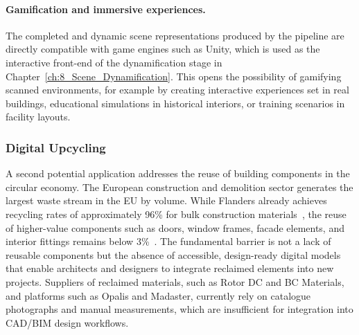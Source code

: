 \paragraph{Gamification and immersive experiences.} The completed and dynamic scene representations produced by the pipeline are directly compatible with game engines such as Unity, which is used as the interactive front-end of the dynamification stage in Chapter~\ref{ch:8_Scene_Dynamification}. This opens the possibility of gamifying scanned environments, for example by creating interactive experiences set in real buildings, educational simulations in historical interiors, or training scenarios in facility layouts.

\subsubsection{Digital Upcycling}
\label{sec:val_upcycling}

A second potential application addresses the reuse of building components in the circular economy. The European construction and demolition sector generates the largest waste stream in the EU by volume. While Flanders already achieves recycling rates of approximately 96\% for bulk construction materials~\cite{ovam_recycling_2024}, the reuse of higher-value components such as doors, window frames, facade elements, and interior fittings remains below 3\%~\cite{province_of_limburg_digital_2026}. The fundamental barrier is not a lack of reusable components but the absence of accessible, design-ready digital models that enable architects and designers to integrate reclaimed elements into new projects. Suppliers of reclaimed materials, such as Rotor DC and BC Materials, and platforms such as Opalis and Madaster, currently rely on catalogue photographs and manual measurements, which are insufficient for integration into CAD/BIM design workflows.

